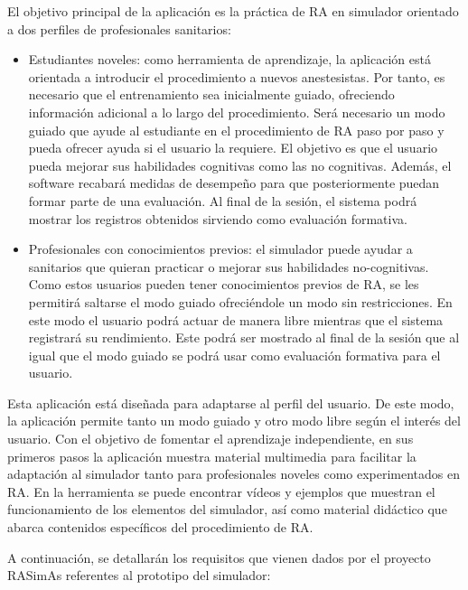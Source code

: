 El objetivo principal de la aplicación es la práctica de \ac{RA} en simulador orientado a dos perfiles de profesionales sanitarios:
\begin{itemize}
    \item Estudiantes noveles: como herramienta de aprendizaje, la aplicación está orientada a introducir el procedimiento a nuevos anestesistas. Por tanto, es necesario que el entrenamiento sea inicialmente guiado, ofreciendo información adicional a lo largo del procedimiento. Será necesario un modo guiado que ayude al estudiante en el procedimiento de \ac{RA} paso por paso y pueda ofrecer ayuda si el usuario la requiere. El objetivo es que el usuario pueda mejorar sus habilidades cognitivas como las no cognitivas. Además, el software recabará medidas de desempeño para que posteriormente puedan formar parte de una evaluación. Al final de la sesión, el sistema podrá mostrar los registros obtenidos sirviendo como evaluación formativa.

\item Profesionales con conocimientos previos: el simulador puede ayudar a sanitarios que quieran practicar o mejorar sus habilidades no-cognitivas. Como estos usuarios pueden tener conocimientos previos de \ac{RA}, se les permitirá saltarse el modo guiado ofreciéndole un modo sin restricciones. En este modo el usuario podrá actuar de manera libre mientras que el sistema registrará su rendimiento. Este podrá ser mostrado al final de la sesión que al igual que el modo guiado se podrá usar como evaluación formativa para el usuario.

\end{itemize}


Esta aplicación está diseñada para adaptarse al perfil del usuario. De este modo, la aplicación permite tanto un modo guiado y otro modo libre según el interés del usuario. 
Con el objetivo de fomentar el aprendizaje independiente, en sus primeros pasos la aplicación muestra material multimedia para facilitar la adaptación al simulador tanto para profesionales noveles como experimentados en \ac{RA}. En la herramienta se puede encontrar vídeos y ejemplos que muestran el funcionamiento de los elementos del simulador, así como material didáctico que abarca contenidos específicos del procedimiento de \ac{RA}.



A continuación, se detallarán los requisitos que vienen dados por el proyecto \ac{RASimAs} referentes al prototipo del simulador:


